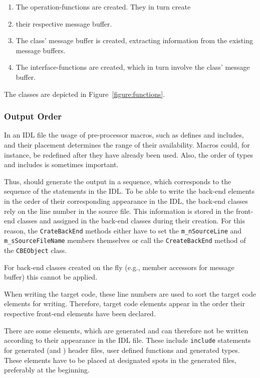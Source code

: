\begin{enumerate}
\item The operation-functions are created. They in turn create
\item their respective message buffer.
\item The class' message buffer is created, extracting information
      from the existing message buffers.
\item The interface-functions are created, which in turn involve
      the class' message buffer.
\end{enumerate}

The classes are depicted in Figure~\ref{figure:functions}.


\subsubsection{Output Order}
In an IDL file the usage of pre-processor macros, such as defines and
includes, and their placement determines the range of their availability.
Macros could, for instance, be redefined after they have already been 
used. Also, the order of types and includes is sometimes important.

Thus, \dice{} should generate the output in a sequence, which corresponds
to the sequence of the statements in the IDL.  To be able to write the
back-end elements in the order of their corresponding appearance in the 
IDL, the back-end classes rely on the line number in the source file.
This information is stored in the front-end classes and assigned in the
back-end classes during their creation.  For this reason, the 
\verb|CrateBackEnd| methods either have to set the \verb|m_nSourceLine| and
\verb|m_sSourceFileName| members themselves or call the \verb|CreateBackEnd|
method of the \verb|CBEObject| class.

For back-end classes created on the fly (e.g., member accessors for 
message buffer) this cannot be applied. 

When writing the target code, these line numbers are used to sort the
target code elements for writing.  Therefore, target code elements
appear in the order their respective front-end elements have been declared.

There are some elements, which are generated and can therefore not be
written according to their appearance in the IDL file. These include 
\verb|include| statements for generated (and \dice{}) header files, user
defined functions and generated types.  These elements have to be placed 
at designated spots in the generated files, preferably at the beginning.

